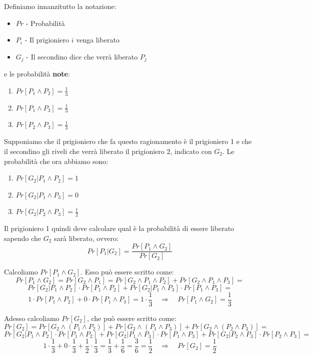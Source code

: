 \begin{minipage}{0.50\textwidth}
	Definiamo innanzitutto la notazione:
	\begin{itemize}
		\item $Pr$ - Probabilità
		\item $P_i$ - Il prigioniero $i$ venga liberato
		\item $G_j$ - Il secondino dice che verrà liberato $P_j$
	\end{itemize}
\end{minipage}
\qquad
\begin{minipage}{0.45\textwidth}
	e le probabilità \textbf{note}:
	\begin{enumerate}
		\item $Pr[P_1 \wedge P_2] = \frac{1}{3}$
		\item $Pr[P_1 \wedge P_3] = \frac{1}{3}$
		\item $Pr[P_2 \wedge P_3] = \frac{1}{3}$
	\end{enumerate}
\end{minipage}

Supponiamo che il prigioniero che fa questo ragionamento è il prigioniero 1 e che il secondino gli riveli che verrà liberato il prigioniero 2, indicato con $G_2$. Le probabilità che ora abbiamo sono:
\begin{enumerate}
	\item $Pr[G_2|P_1 \wedge P_2] = 1$
	\item $Pr[G_2|P_1 \wedge P_3] = 0$
	\item $Pr[G_2|P_2 \wedge P_3] = \frac{1}{2}$
\end{enumerate}

Il prigioniero 1 quindi deve calcolare qual è la probabilità di essere liberato sapendo che $G_2$ sarà liberato, ovvero:
$$
Pr[P_1|G_2] = \frac{Pr[P_1 \wedge G_2]}{Pr[G_2]}
$$

\newpage
Calcoliamo $Pr[P_1 \wedge G_2]$. Esso può essere scritto come:
$$
Pr[P_1 \wedge G_2] = Pr[G_2 \wedge P_1] = Pr[G_2 \wedge P_1 \wedge P_2] + Pr[G_2 \wedge P_1 \wedge P_3] =
$$
$$
Pr[G_2|P_1 \wedge P_2] \cdot Pr[P_1 \wedge P_2] + Pr[G_2|P_1 \wedge P_3] \cdot Pr[P_1 \wedge P_3] =
$$
$$
1 \cdot Pr[P_1 \wedge P_2] + 0 \cdot Pr[P_1 \wedge P_3] = 1 \cdot \frac{1}{3} \quad\Rightarrow\quad Pr[P_1 \wedge G_2] = \frac{1}{3}
$$

Adesso calcoliamo $Pr[G_2]$, che può essere scritto come:
$$
Pr[G_2] = Pr[G_2 \wedge (P_1 \wedge P_2)] + Pr[G_2 \wedge (P_1 \wedge P_3)] + Pr[G_2 \wedge (P_2 \wedge P_3)] =
$$
$$
Pr[G_2|P_1 \wedge P_2] \cdot Pr[P_1 \wedge P_2] + Pr[G_2|P_1 \wedge P_3] \cdot Pr[P_1 \wedge P_3] + Pr[G_2|P_2 \wedge P_3] \cdot Pr[P_2 \wedge P_3] =
$$
$$
1 \cdot \frac{1}{3} + 0 \cdot \frac{1}{3} + \frac{1}{2} \cdot \frac{1}{3} = \frac{1}{3} + \frac{1}{6} = \frac{3}{6} = \frac{1}{2} \quad \Rightarrow \quad Pr[G_2] = \frac{1}{2}
$$


